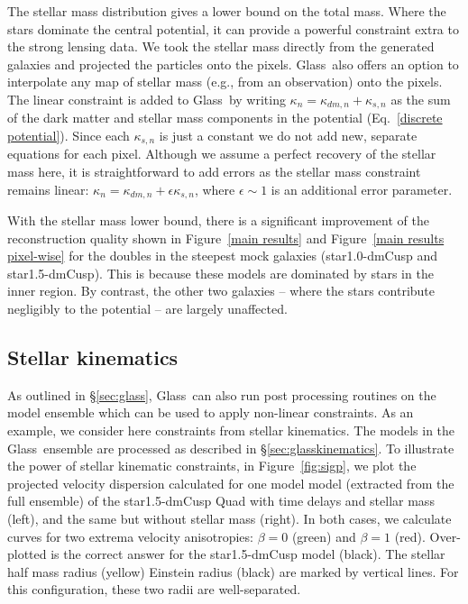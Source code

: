 \documentclass[galley,usenatbib]{mn2e}
\newcommand{\Glass}{{\sc Glass}}
\newcommand{\figref}[1] {Figure~\ref{#1}}
\newcommand{\eqnrefp}[1] {(Eq.~\ref{#1})}
\newcommand{\secref}[1] {\S\ref{#1}}
\newcommand{\mockAC}{{\sc star1.0-dmCusp}}
\newcommand{\mockBC}{{\sc star1.5-dmCusp}}
\begin{document}
The stellar mass distribution gives a lower bound on the total mass. Where the
stars dominate the central potential, it can provide a powerful constraint
extra to the strong lensing data. We took the stellar mass directly from the
generated galaxies and projected the particles onto the pixels. \Glass\ also
offers an option to interpolate any map of stellar mass (e.g., from an
observation) onto the pixels. The linear constraint is added to \Glass\ by
writing $\kappa_n = \kappa_{dm,n} + \kappa_{s,n}$ as the sum of the dark matter
and stellar mass components in the potential \eqnrefp{discrete potential}.
Since each $\kappa_{s,n}$ is just a constant we do not add new, separate
equations for each pixel. Although we assume a perfect recovery of the stellar
mass here, it is straightforward to add errors as the stellar mass constraint
remains linear: $\kappa_n = \kappa_{dm,n} + \epsilon \kappa_{s,n}$, where
$\epsilon \sim 1$ is an additional error parameter. 

With the stellar mass lower bound, there is a significant improvement of the
reconstruction quality shown in \figref{main results} and \figref{main results
pixel-wise} for the doubles in the steepest mock galaxies (\mockAC{} and
\mockBC). This is because these models are dominated by stars in the inner
region. By contrast, the other two galaxies -- where the stars contribute
negligibly to the potential -- are largely unaffected.

\subsection{Stellar kinematics}\label{sec:results_stellar_kinematics}

As outlined in \secref{sec:glass}, \Glass\ can also run post processing
routines on the model ensemble which can be used to apply non-linear
constraints. As an example, we consider here constraints from stellar
kinematics. The models in the \Glass\ ensemble are processed as described in
\S\ref{sec:glasskinematics}.  To illustrate the power of stellar kinematic
constraints, in \figref{fig:sigp}, we plot the projected velocity dispersion
calculated for one model model (extracted from the full ensemble) of the
\mockBC{} Quad with time delays and stellar mass (left), and the same but
without stellar mass (right).  In both cases, we calculate curves for two
extrema velocity anisotropies: $\beta=0$ (green) and $\beta=1$ (red).
Over-plotted is the correct answer for the \mockBC{} model (black). The stellar
half mass radius (yellow) Einstein radius (black) are marked by vertical lines.
For this configuration, these two radii are well-separated.
\end{document}
